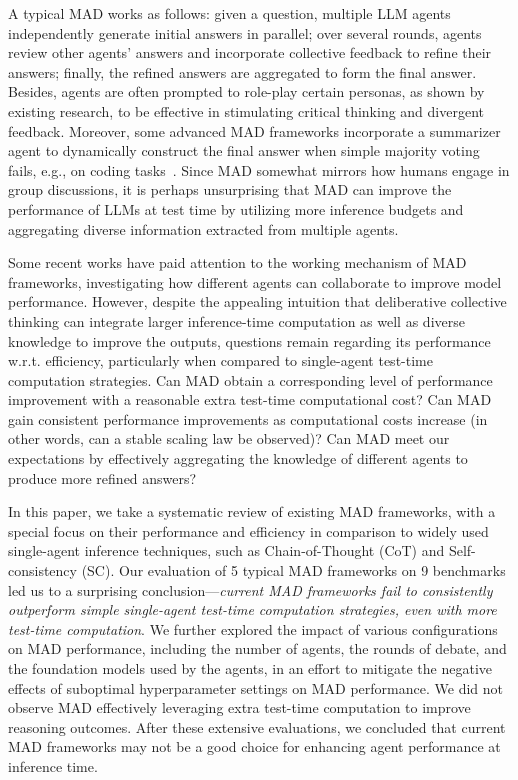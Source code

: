 A typical MAD works as follows: given a question, multiple LLM agents independently generate initial answers in parallel; over several rounds, agents review other agents' answers and incorporate collective feedback to refine their answers; finally, the refined answers are aggregated to form the final answer. 
Besides, agents are often prompted to role-play certain personas, as shown by existing research, to be effective in stimulating critical thinking and divergent feedback.
Moreover, some advanced MAD frameworks incorporate a summarizer agent to dynamically construct the final answer when simple majority voting fails, e.g., on coding tasks~\cite{chen2023agentverse}. 
Since MAD somewhat mirrors how humans engage in group discussions, it is perhaps unsurprising that MAD can improve the performance of LLMs at test time by utilizing more inference budgets and aggregating diverse information extracted from multiple agents.

Some recent works \cite{smit2023we, wang2024rethinking} have paid attention to the working mechanism of MAD frameworks, investigating how different agents can collaborate to improve model performance. However, despite the appealing intuition that deliberative collective thinking can integrate larger inference-time computation as well as diverse knowledge to improve the outputs, questions remain regarding its performance w.r.t. efficiency, particularly when compared to single-agent test-time computation strategies. Can MAD obtain a corresponding level of performance improvement with a reasonable extra test-time computational cost? Can MAD gain consistent performance improvements as computational costs increase (in other words, can a stable scaling law be observed)? Can MAD meet our expectations by effectively aggregating the knowledge of different agents to produce more refined answers?

In this paper, we take a systematic review of existing MAD frameworks, with a special focus on their performance and efficiency in comparison to widely used single-agent inference techniques, such as Chain-of-Thought (CoT) and Self-consistency (SC). Our evaluation of 5 typical MAD frameworks on 9 benchmarks led us to a surprising conclusion---\emph{current MAD frameworks fail to consistently outperform simple single-agent test-time computation strategies, even with more test-time computation}. We further explored the impact of various configurations on MAD performance, including the number of agents, the rounds of debate, and the foundation models used by the agents, in an effort to mitigate the negative effects of suboptimal hyperparameter settings on MAD performance. We did not observe MAD effectively leveraging extra test-time computation to improve reasoning outcomes. After these extensive evaluations, we concluded that current MAD frameworks may not be a good choice for enhancing agent performance at inference time. 

